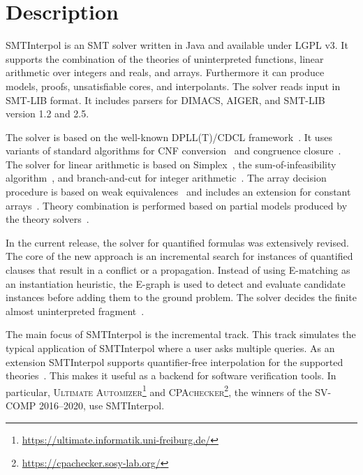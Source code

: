 \documentclass[a4paper]{easychair}
\title{\SI\\{\large Version\version}}
\author{Jochen Hoenicke \and Tanja Schindler}
\institute{
  University of Freiburg\\
  \email{\{hoenicke,schindle\}@informatik.uni-freiburg.de}\\[1ex]
  \today
}
\newcommand\SI{SMTInterpol\xspace}
\begin{document}
\maketitle
\section*{Description}
\SI is an SMT solver written in Java and available under LGPL v3.  It supports
the combination of the theories of uninterpreted functions,
linear arithmetic over integers and reals, and arrays.  Furthermore it can
produce models, proofs, unsatisfiable cores, and interpolants.  The solver
reads input in SMT-LIB format.  It includes parsers for DIMACS, AIGER, and
SMT-LIB version 1.2 and 2.5.

The solver is based on the well-known DPLL(T)/CDCL framework~\cite{DBLP:conf/cav/GanzingerHNOT04}.
It uses variants of standard algorithms for CNF
conversion~\cite{DBLP:journals/jsc/PlaistedG86} and congruence
closure~\cite{DBLP:conf/rta/NieuwenhuisO05}.
The solver for linear arithmetic is based on Simplex~\cite{DBLP:conf/cav/DutertreM06}, the sum-of-infeasibility algorithm~\cite{DBLP:conf/fmcad/KingBD13}, and branch-and-cut for integer arithmetic~\cite{DBLP:conf/cav/ChristH15,DBLP:conf/cav/DilligDA09}.
The array decision procedure is based on weak equivalences~\cite{DBLP:conf/frocos/ChristH15} and includes an extension for constant arrays~\cite{DBLP:conf/vmcai/HoenickeS19}.
Theory combination is performed based on partial models produced by the theory solvers~\cite{DBLP:journals/entcs/MouraB08}.

In the current release, the solver for quantified formulas was extensively revised.
The core of the new approach is an incremental search for instances of quantified clauses that result in a conflict or a propagation.
Instead of using E-matching as an instantiation heuristic, the E-graph is used to detect and evaluate candidate instances before adding them to the ground problem.
The solver decides the finite almost uninterpreted fragment~\cite{DBLP:conf/cav/GeM09}.

The main focus of \SI is the incremental track.
This track simulates the typical application of \SI where a user asks multiple queries.
As an extension \SI supports quantifier-free interpolation for the supported theories~\cite{DBLP:journals/jar/ChristH16,DBLP:conf/cade/HoenickeS18,DBLP:conf/vmcai/HoenickeS19}.
This makes it useful as a backend for software verification tools.  In particular,
\textsc{Ultimate Automizer}\footnote{\url{https://ultimate.informatik.uni-freiburg.de/}}
and \textsc{CPAchecker}\footnote{\url{https://cpachecker.sosy-lab.org/}}, the winners of the SV-COMP 2016--2020, use \SI.
\end{document}
